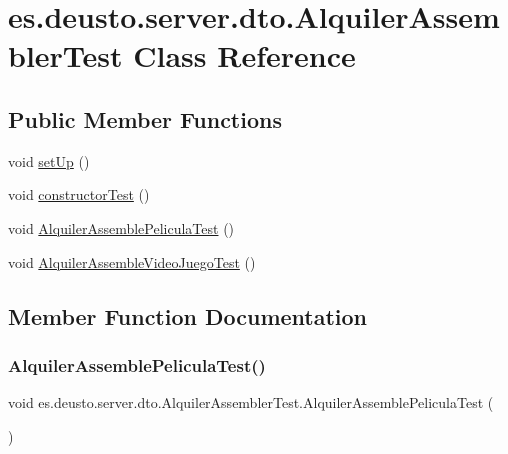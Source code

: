 \hypertarget{classes_1_1deusto_1_1server_1_1dto_1_1_alquiler_assembler_test}{}\section{es.\+deusto.\+server.\+dto.\+Alquiler\+Assembler\+Test Class Reference}
\label{classes_1_1deusto_1_1server_1_1dto_1_1_alquiler_assembler_test}
\subsection*{Public Member Functions}
\begin{DoxyCompactItemize}
\item 
void \mbox{\hyperlink{classes_1_1deusto_1_1server_1_1dto_1_1_alquiler_assembler_test_a4a0695ea12a4ad515c729a1c854db8dd}{set\+Up}} ()
\item 
void \mbox{\hyperlink{classes_1_1deusto_1_1server_1_1dto_1_1_alquiler_assembler_test_adcc86d9fec3a67d35869ceeb22995b16}{constructor\+Test}} ()
\item 
void \mbox{\hyperlink{classes_1_1deusto_1_1server_1_1dto_1_1_alquiler_assembler_test_a9b40b4a94514787233bba198ffa43d69}{Alquiler\+Assemble\+Pelicula\+Test}} ()
\item 
void \mbox{\hyperlink{classes_1_1deusto_1_1server_1_1dto_1_1_alquiler_assembler_test_a4b9ade20f051da34c217eaa7f15d9824}{Alquiler\+Assemble\+Video\+Juego\+Test}} ()
\end{DoxyCompactItemize}


\subsection{Member Function Documentation}
\mbox{\label{classes_1_1deusto_1_1server_1_1dto_1_1_alquiler_assembler_test_a9b40b4a94514787233bba198ffa43d69}} 
\subsubsection{\texorpdfstring{AlquilerAssemblePeliculaTest()}{AlquilerAssemblePeliculaTest()}}
{\footnotesize\ttfamily void es.\+deusto.\+server.\+dto.\+Alquiler\+Assembler\+Test.\+Alquiler\+Assemble\+Pelicula\+Test (\begin{DoxyParamCaption}{ }\end{DoxyParamCaption})}

